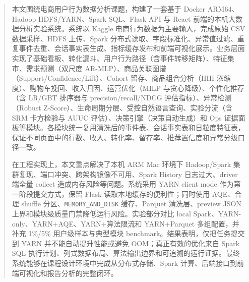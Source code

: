 
\begin{abstract}
  本文围绕电商用户行为数据分析课题，构建了一套基于 Docker ARM64、Hadoop HDFS/YARN、Spark SQL、Flask API 与 React 前端的本机大数据分析实验系统。系统以 Kaggle 电商行为数据为主要输入，完成原始 CSV 数据采样、HDFS 上传、Spark 分布式读取、字段标准化、异常值过滤、重复事件去重、会话事实表生成、指标缓存发布和前端可视化展示。业务层面实现了基础看板、转化漏斗、用户行为路径（含事件转移矩阵）、特征集市、需求预测（双尺度 AR-MLP）、商品关联图谱（Support/Confidence/Lift）、Cohort 留存、商品组合分析（HHI 浓缩度）、购物车挽回、收入归因、运营优化（MILP 与贪心降级）、个性化推荐（含 LR/GBT 排序器与 precision/recall/NDCG 评估指标）、异常检测（Robust Z-Score）、生命周期分层、受控自然语言查询、实验分流（含 SRM 卡方检验与 AUUC 评估）、决策引擎（决策自动生成）和 Ops 证据面板等模块。各模块统一复用清洗后的事件表、会话事实表和日粒度特征表，保证不同页面中的行数、收入、转化率、留存率、推荐置信度和异常分级口径一致。

  在工程实现上，本文重点解决了本机 ARM Mac 环境下 Hadoop/Spark 集群复现、端口冲突、跨架构镜像不可用、Spark History 日志过大、driver 端全量 collect 造成内存风险等问题。系统采用 YARN client mode 作为第一阶段提交方式，保留 Flask 读取本地缓存的便利性；同时使用 AQE、合理 shuffle 分区、\texttt{MEMORY\_AND\_DISK} 缓存、Parquet 清洗层、preview JSON 上界和模块级质量门禁降低运行风险。实验部分对比 local Spark、YARN-only、YARN+AQE、YARN+算法限流和 YARN+Parquet 多组配置，并补充 1\%/5\% 用户级样本与典型模块 benchmark。结果表明，仅把任务提交到 YARN 并不能自动提升性能或避免 OOM；真正有效的优化来自 Spark SQL 执行计划、列式数据布局、算法输出边界和可追溯的运行证据。最终系统能够在课程设计环境中完成从分布式存储、Spark 计算、后端接口到前端可视化和报告分析的完整闭环。
\end{abstract}
